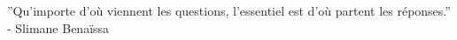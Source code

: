 ''Qu'importe d'où viennent les questions, l'essentiel est d'où partent les réponses.'' - Slimane Benaïssa
